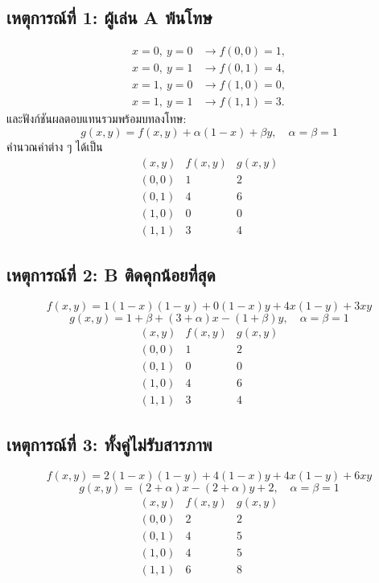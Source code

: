 \subsection{เหตุการณ์ที่ 1: ผู้เล่น A พ้นโทษ}
\[
\begin{aligned}
x=0,\ y=0 &\longrightarrow f(0,0)=1,\\
x=0,\ y=1 &\longrightarrow f(0,1)=4,\\
x=1,\ y=0 &\longrightarrow f(1,0)=0,\\
x=1,\ y=1 &\longrightarrow f(1,1)=3.
\end{aligned}
\]
และฟังก์ชันผลตอบแทนรวมพร้อมบทลงโทษ:
\[
g(x,y) = f(x,y) + \alpha(1-x) + \beta y, \quad \alpha=\beta=1
\]
คำนวณค่าต่าง ๆ ได้เป็น
\[
\begin{array}{l|cc}
(x,y) & f(x,y) & g(x,y) \\ \hline
(0,0) & 1 & 2\\
(0,1) & 4 & 6\\
(1,0) & 0 & 0\\
(1,1) & 3 & 4
\end{array}
\]

\subsection{เหตุการณ์ที่ 2: B ติดคุกน้อยที่สุด}
\[
f(x,y) = 1(1-x)(1-y) + 0(1-x)y + 4x(1-y) + 3xy
\]
\[
g(x,y) = 1 + \beta + (3+\alpha)x - (1+\beta)y, \quad \alpha=\beta=1
\]
\[
\begin{array}{l|cc}
(x,y) & f(x,y) & g(x,y) \\ \hline
(0,0) & 1 & 2\\
(0,1) & 0 & 0\\
(1,0) & 4 & 6\\
(1,1) & 3 & 4
\end{array}
\]

\subsection{เหตุการณ์ที่ 3: ทั้งคู่ไม่รับสารภาพ}
\[
f(x,y) = 2(1-x)(1-y) + 4(1-x)y + 4x(1-y) + 6xy
\]
\[
g(x,y) = (2+\alpha)x - (2+\alpha)y + 2, \quad \alpha=\beta=1
\]
\[
\begin{array}{l|cc}
(x,y) & f(x,y) & g(x,y) \\ \hline
(0,0) & 2 & 2\\
(0,1) & 4 & 5\\
(1,0) & 4 & 5\\
(1,1) & 6 & 8
\end{array}
\]

